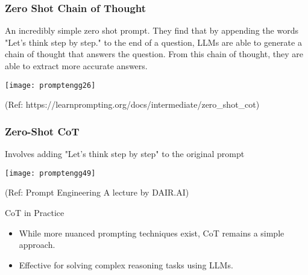 



\begin{frame}[fragile]\frametitle{Zero Shot Chain of Thought}

An incredibly simple zero shot prompt. They find that by appending the words "Let's think step by step." to the end of a question, LLMs are able to generate a chain of thought that answers the question. From this chain of thought, they are able to extract more accurate answers.

\begin{center}
\texttt{[image: promptengg26]}

{\tiny (Ref: https://learnprompting.org/docs/intermediate/zero\_shot\_cot)}

\end{center}		

\end{frame}

\begin{frame}[fragile]\frametitle{Zero-Shot CoT}

 Involves adding "Let's think step by step" to the original 
prompt


\begin{center}
\texttt{[image: promptengg49]}

{\tiny (Ref: Prompt Engineering A lecture by DAIR.AI)}

\end{center}	

\end{frame}

\begin{frame}[fragile]{CoT in Practice}
    \begin{itemize}
        \item While more nuanced prompting techniques exist, CoT remains a simple approach.
        \item Effective for solving complex reasoning tasks using LLMs.
    \end{itemize}
\end{frame}



